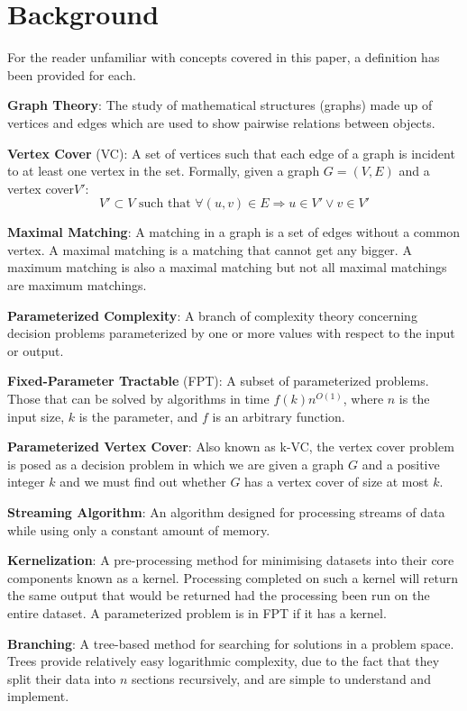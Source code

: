 \section{Background}

For the reader unfamiliar with concepts covered in this paper, a definition
has been provided for each.

\textbf{Graph Theory}: The study of mathematical structures (graphs) made up of
vertices and edges which are used to show pairwise relations between objects.

\textbf{Vertex Cover} (VC): A set of vertices such that each edge of a graph is
incident to at least one vertex in the set. Formally, given a graph \(G = (V,
E)\) and a vertex cover\(V'\):
\[
    V' \subset V \text{ such that } \forall (u, v) \in E \Rightarrow u \in V' \vee v \in V'
\]

\textbf{Maximal Matching}: A matching in a graph is a set of edges without a
common vertex. A maximal matching is a matching that cannot get any
bigger. A maximum matching is also a maximal matching but not all maximal
matchings are maximum matchings.

\textbf{Parameterized Complexity}: A branch of complexity theory concerning
decision problems parameterized by one or more values with respect to the input
or output.

\textbf{Fixed-Parameter Tractable} (FPT): A subset of parameterized problems.
Those that can be solved by algorithms in time \(f(k)n^{O(1)}\), where \(n\) is
the input size, \(k\) is the parameter, and \(f\) is an arbitrary function.

\textbf{Parameterized Vertex Cover}: Also known as k-VC, the vertex cover
problem is posed as a decision problem in which we are given a graph \(G\) and
a positive integer \(k\) and we must find out whether \(G\) has a vertex cover
of size at most \(k\).

\textbf{Streaming Algorithm}: An algorithm designed for processing streams of
data while using only a constant amount of memory.

\textbf{Kernelization}: A pre-processing method for minimising datasets into
their core components known as a kernel. Processing completed on such a kernel
will return the same output that would be returned had the processing been run
on the entire dataset. A parameterized problem is in FPT if it has a kernel.

\textbf{Branching}: A tree-based method for searching for solutions in a
problem space. Trees provide relatively easy logarithmic complexity, due to the
fact that they split their data into \(n\) sections recursively, and are simple
to understand and implement.
